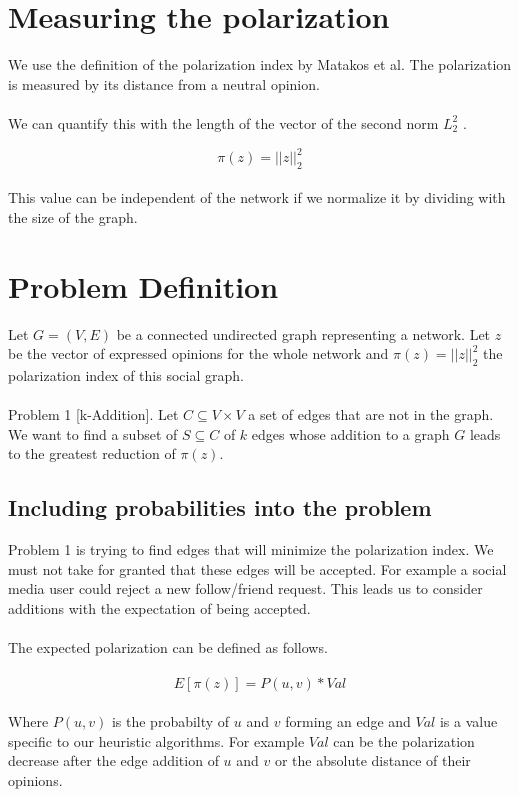 \section{Measuring the polarization}
\label{sec:meas}

\noindent We use the definition of the polarization index by Matakos et al. The polarization is measured by its distance from a neutral opinion. 
\\
\\
We can quantify this with the length of the vector of the second norm $L_{2}^2$ \cite{tsapMatakosTerzi}.
\clearpage


\begin{equation}
	\pi(z) = ||z||_{2}^2
\end{equation}
\\
This value can be independent of the network if we normalize it by dividing with the size of the graph.

\section{Problem Definition}
\label{sec:problemDef}

\noindent Let $G = (V,E)$ be a connected undirected graph representing a network. Let $z$ be the vector of expressed opinions  for the whole network and $\pi(z) = ||z||_{2}^2$ the polarization index of this social graph.
\\
\\
\noindent Problem 1 [k-Addition]. Let $C \subseteq	V \times V$ a set of edges that are not in the graph. We want to find a subset of $S \subseteq C$ of $k$ edges whose addition to a graph $G$ leads to the greatest reduction of $\pi(z)$.


\subsection{Including probabilities into the problem}
\label{sec:probabilityProbDef}

Problem 1 is trying to find edges that will minimize the polarization index. We must not take for granted that these edges will be accepted. 
For example a social media user could reject a new follow/friend request. This leads us to consider additions with the expectation of being accepted. 
\\
\\
The expected polarization can be defined as follows.
\\
\\
\begin{equation}
	E[\pi(z)]= P(u,v) * Val
\end{equation}
\\
\noindent Where $P(u,v)$ is the probabilty of $u$ and $v$ forming an edge and $Val$ is a value specific to our heuristic algorithms. For example $Val$ can be the polarization decrease after the edge addition of $u$ and $v$ or the absolute distance of their opinions.
\clearpage


